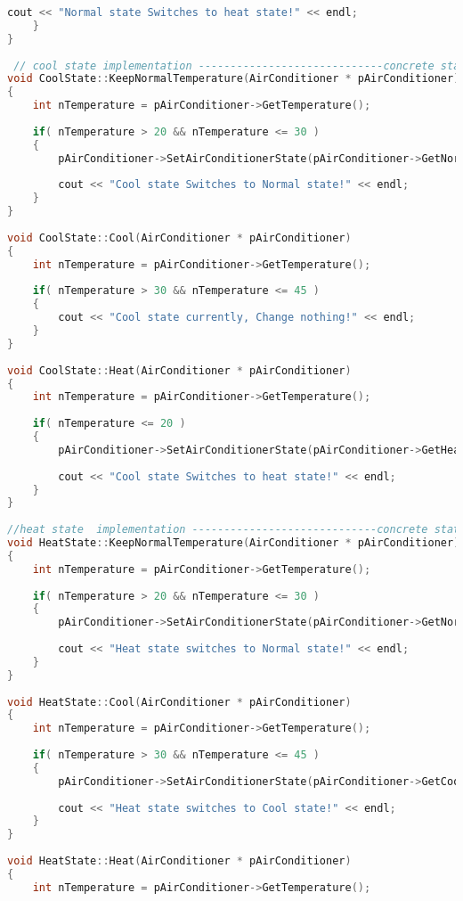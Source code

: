 \documentclass{book}
\begin{document}
\begin{lstlisting}[caption={State Pattern exmaple 1}, language=C++]
        cout << "Normal state Switches to heat state!" << endl;  
    }  
}  
 
 // cool state implementation -----------------------------concrete states
void CoolState::KeepNormalTemperature(AirConditioner * pAirConditioner)  
{  
    int nTemperature = pAirConditioner->GetTemperature();  
      
    if( nTemperature > 20 && nTemperature <= 30 )  
    {  
        pAirConditioner->SetAirConditionerState(pAirConditioner->GetNormalTemperatureState());  
  
        cout << "Cool state Switches to Normal state!" << endl;  
    }  
}  
      
void CoolState::Cool(AirConditioner * pAirConditioner)  
{  
    int nTemperature = pAirConditioner->GetTemperature();  
      
    if( nTemperature > 30 && nTemperature <= 45 )  
    {  
        cout << "Cool state currently, Change nothing!" << endl;  
    }  
}  
  
void CoolState::Heat(AirConditioner * pAirConditioner)  
{  
    int nTemperature = pAirConditioner->GetTemperature();  
      
    if( nTemperature <= 20 )  
    {  
        pAirConditioner->SetAirConditionerState(pAirConditioner->GetHeatState());  
  
        cout << "Cool state Switches to heat state!" << endl;  
    }  
}  
  
//heat state  implementation -----------------------------concrete states
void HeatState::KeepNormalTemperature(AirConditioner * pAirConditioner)  
{  
    int nTemperature = pAirConditioner->GetTemperature();  
      
    if( nTemperature > 20 && nTemperature <= 30 )  
    {  
        pAirConditioner->SetAirConditionerState(pAirConditioner->GetNormalTemperatureState());  
  
        cout << "Heat state switches to Normal state!" << endl;  
    }  
}  
      
void HeatState::Cool(AirConditioner * pAirConditioner)  
{  
    int nTemperature = pAirConditioner->GetTemperature();  
      
    if( nTemperature > 30 && nTemperature <= 45 )  
    {  
        pAirConditioner->SetAirConditionerState(pAirConditioner->GetCoolState());  
  
        cout << "Heat state switches to Cool state!" << endl;  
    }  
}  
  
void HeatState::Heat(AirConditioner * pAirConditioner)  
{  
    int nTemperature = pAirConditioner->GetTemperature();  
      

\end{lstlisting}
\end{document}
